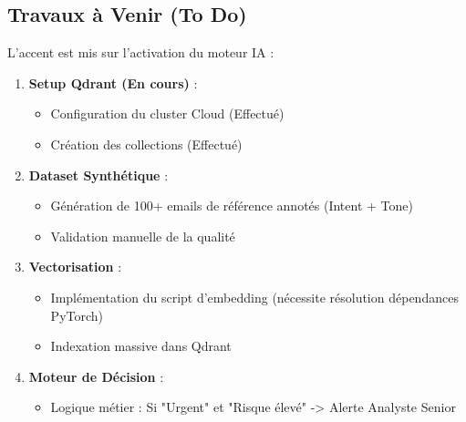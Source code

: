 \documentclass[11pt]{article}
\begin{document}
\subsection{Travaux à Venir (To Do)}
L'accent est mis sur l'activation du moteur IA :
\begin{enumerate}
    \item \textbf{Setup Qdrant (En cours)} :
    \begin{itemize}
        \item Configuration du cluster Cloud (Effectué)
        \item Création des collections (Effectué)
    \end{itemize}
    \item \textbf{Dataset Synthétique} :
    \begin{itemize}
        \item Génération de 100+ emails de référence annotés (Intent + Tone)
        \item Validation manuelle de la qualité
    \end{itemize}
    \item \textbf{Vectorisation} :
    \begin{itemize}
        \item Implémentation du script d'embedding (nécessite résolution dépendances PyTorch)
        \item Indexation massive dans Qdrant
    \end{itemize}
    \item \textbf{Moteur de Décision} :
    \begin{itemize}
        \item Logique métier : Si "Urgent" et "Risque élevé" -> Alerte Analyste Senior
    \end{itemize}
\end{enumerate}
\end{document}
